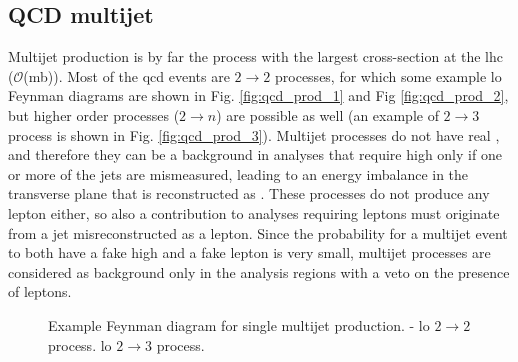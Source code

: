 \subsection{QCD multijet}

Multijet production is by far the process with the largest cross-section at the \gls{lhc} ($\mathcal{O}$(mb)). 
Most of the \gls{qcd} events are $2 \to 2$ processes, for which some example \gls{lo} Feynman diagrams are shown in Fig. \ref{fig:qcd_prod_1} and Fig \ref{fig:qcd_prod_2}, but higher order processes ($2 \to n$) are possible as well (an example of $2 \to 3$ process is shown in Fig. \ref{fig:qcd_prod_3}). 
Multijet processes do not have real \met, and therefore they can be a background in analyses that require high \met only if one or more of the jets are mismeasured, leading to an energy imbalance in the transverse plane that is reconstructed as \met. 
These processes do not produce any lepton either, so also a contribution to analyses requiring leptons must originate from a jet misreconstructed as a lepton. 
Since the probability for a multijet event to both have a fake high \met and a fake lepton is very small, multijet processes are considered as background only in the analysis regions with a veto on the presence of leptons. 


\begin{figure}[h!]
\centering 
{}
\caption{Example Feynman diagram for single multijet production. - \gls{lo} $2 \to 2$ process. 
 \gls{lo} $2 \to 3$ process.}\label{fig:qcd_prod}
\end{figure}

